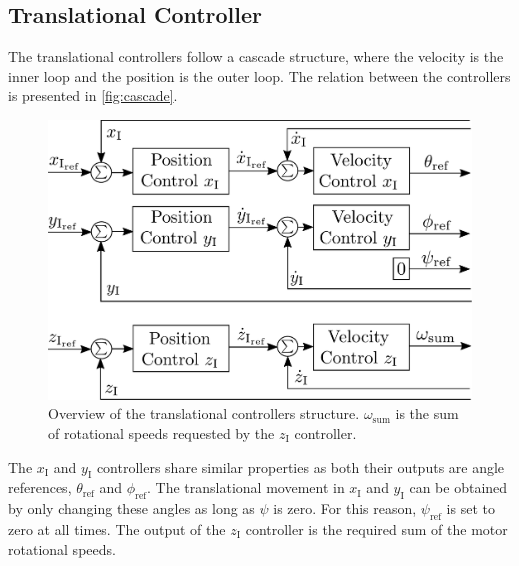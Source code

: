 \subsection{Translational Controller}
The translational controllers follow a cascade structure, where the velocity is the inner loop and the position is the outer loop. The relation between the controllers is presented in \autoref{fig:cascade}.
%
\begin{figure}[H]
\centering
	\includegraphics[width=.42\textwidth]{figures/TranslationalControlDiagramSmall.pdf}
	\caption{Overview of the translational controllers structure. $\omega_{\mathrm{sum}}$ is the sum of rotational speeds requested by the $z_{\mathrm{I}}$ controller.}
	\label{fig:cascade}
\end{figure}

The $x_{\mathrm{I}}$ and $y_{\mathrm{I}}$ controllers share similar properties as both their outputs are angle references, $\theta_{\mathrm{ref}}$ and $\phi_{\mathrm{ref}}$. The translational movement in $x_{\mathrm{I}}$ and $y_{\mathrm{I}}$ can be obtained by only changing these angles as long as $\psi$ is zero. For this reason, $\psi_{\mathrm{ref}}$ is set to zero at all times. The output of the $z_{\mathrm{I}}$ controller is the required sum of the motor rotational speeds.

